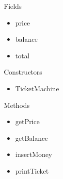 \par{Fields}
\begin{itemize}
	\item price
	\item balance
	\item total
\end{itemize}

\par{Constructors}
\begin{itemize}
	\item TicketMachine
\end{itemize}

\par{Methods}
\begin{itemize}
	\item getPrice
	\item getBalance
	\item insertMoney
	\item printTicket
\end{itemize}
